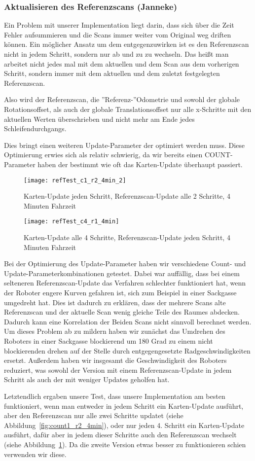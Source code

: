 \subsubsection{Aktualisieren des Referenzscans (Janneke)}

Ein Problem mit unserer Implementation liegt darin, dass sich über die Zeit Fehler aufsummieren und die Scans immer weiter vom Original weg driften können. Ein möglicher Ansatz um dem entgegenzuwirken ist es den Referenzscan nicht in jedem Schritt, sondern nur ab und zu zu wechseln. Das heißt man arbeitet nicht jedes mal mit dem aktuellen und dem Scan aus dem vorherigen Schritt, sondern immer mit dem aktuellen und dem zuletzt festgelegten Referenzscan.

Also wird der Referenzscan, die ''Referenz-''Odometrie und sowohl der globale Rotationsoffset, als auch der globale Translationsoffset nur alle x-Schritte mit den aktuellen Werten überschrieben und nicht mehr am Ende jedes Schleifendurchgangs.

Dies bringt einen weiteren Update-Parameter der optimiert werden muss. Diese Optimierung erwies sich als relativ schwierig, da wir bereits einen COUNT-Parameter haben der bestimmt wie oft das Karten-Update überhaupt passiert.

\begin{figure}
	\centering
	\texttt{[image: refTest\_c1\_r2\_4min\_2]}
	\caption{Karten-Update jeden Schritt, Referenzscan-Update alle 2 Schritte, 4 Minuten Fahrzeit\newline}
	\label{fig:count1_r2_4min}
	\texttt{[image: refTest\_c4\_r1\_4min]}
	\caption{Karten-Update alle 4 Schritte, Referenzscan-Update jeden Schritt, 4 Minuten Fahrzeit}
	\label{fig:count4_r1_4min}
\end{figure}

Bei der Optimierung des Update-Parameter haben wir verschiedene Count- und Update-Parameterkombinationen getestet. Dabei war auffällig, dass bei einem selteneren Referenzscan-Update das Verfahren schlechter funktioniert hat, wenn der Roboter engere Kurven gefahren ist, sich zum Beispiel in einer Sackgasse umgedreht hat. Dies ist dadurch zu erklären, dass der mehrere Scans alte Referenzscan und der aktuelle Scan wenig gleiche Teile des Raumes abdecken. Dadurch kann eine Korrelation der Beiden Scans nicht sinnvoll berechnet werden. Um dieses Problem ab zu mildern haben wir zunächst das Umdrehen des Roboters in einer Sackgasse blockierend um 180 Grad zu einem nicht blockierenden drehen auf der Stelle durch entgegengesetzte Radgeschwindigkeiten ersetzt. Außerdem haben wir insgesamt die Geschwindigkeit des Roboters reduziert, was sowohl der Version mit einem Referenzscan-Update in jedem Schritt als auch der mit weniger Updates geholfen hat.

Letztendlich ergaben unsere Test, dass unsere Implementation am besten funktioniert, wenn man entweder in jedem Schritt ein Karten-Update ausführt, aber den Referenzscan nur alle zwei Schritte updatet (siehe Abbildung~\ref{fig:count1_r2_4min}), oder nur jeden 4. Schritt ein Karten-Update ausführt, dafür aber in jedem dieser Schritte auch den Referenzscan wechselt (siehe Abbildung~\ref{fig:count4_r1_4min}). Da die zweite Version etwas besser zu funktionieren schien verwenden wir diese.